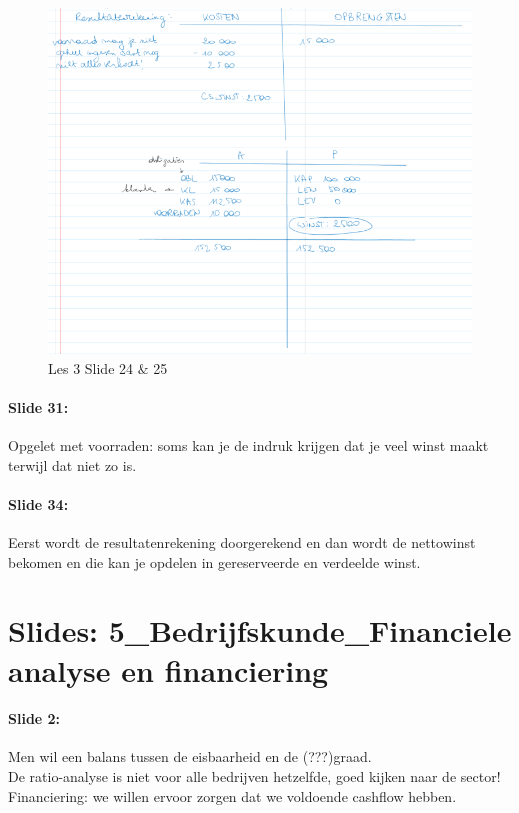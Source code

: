 \documentclass[10pt,a4paper]{report}
\begin{document}
\begin{figure}[h!]
\centering
\includegraphics[width=120mm]{Les03_06.png}
\caption{Les 3 Slide 24 $\&$ 25} 
\label{les03_06}
\end{figure}

\paragraph{Slide 31:} Opgelet met voorraden: soms kan je de indruk krijgen dat je veel winst maakt terwijl dat niet zo is.

\paragraph{Slide 34:} Eerst wordt de resultatenrekening doorgerekend en dan wordt de nettowinst bekomen en die kan je opdelen in gereserveerde en verdeelde winst.

\section{Slides: 5\_Bedrijfskunde\_Financiele analyse en financiering}

\paragraph{Slide 2:} Men wil een balans tussen de eisbaarheid en de (???)graad.\\
De ratio-analyse is niet voor alle bedrijven hetzelfde, goed kijken naar de sector!\\
Financiering: we willen ervoor zorgen dat we voldoende cashflow hebben.
\end{document}

